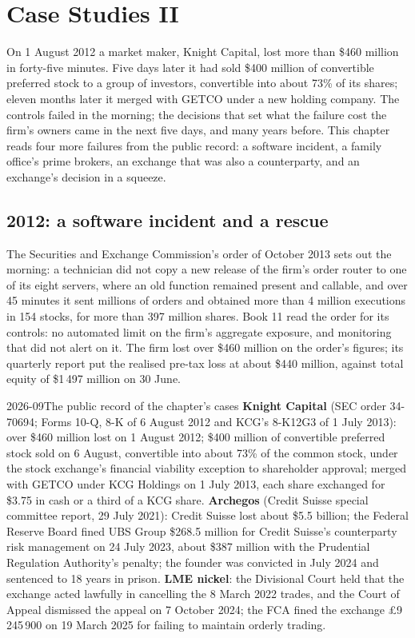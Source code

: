 \chapter{Case Studies II}\label{ch:fm:case-studies-ii}

On 1 August 2012 a market maker, Knight Capital, lost more than \$460 million in forty-five minutes. Five days later it had sold \$400 million of
convertible preferred stock to a group of investors, convertible into about 73\% of its shares; eleven months later it merged with GETCO under a new
holding company. The controls failed in the morning; the decisions that set what the failure cost the firm's owners came in the next five days, and
many years before. This chapter reads four more failures from the public record: a software incident, a family office's prime brokers, an
exchange that was also a counterparty, and an exchange's decision in a squeeze.

\section{2012: a software incident and a rescue}

The Securities and Exchange Commission's order of October 2013 sets out the morning: a technician did not copy a new release of the firm's order router to
one of its eight servers, where an old function remained present and callable, and over 45 minutes it sent millions of orders and obtained more than 4 million executions in 154 stocks,
for more than 397 million shares. Book 11 read the order for its controls: no automated limit on the firm's aggregate exposure, and monitoring that
did not alert on it. The firm lost over \$460 million on the order's figures; its quarterly report put the realised pre-tax loss at about \$440 million,
against total equity of \$1\,497 million on 30 June.

\begin{dated}{2026-09}{The public record of the chapter's cases}\label{dat:fm:case-studies-ii:record}
\textbf{Knight Capital} (SEC order 34-70694; Forms 10-Q, 8-K of 6 August 2012 and KCG's 8-K12G3 of 1 July 2013): over \$460 million lost on 1
August 2012; \$400 million of convertible preferred stock sold on 6 August, convertible into about 73\% of the common stock, under the stock exchange's
financial viability exception to shareholder approval; merged with GETCO under KCG Holdings on 1 July 2013, each share exchanged for \$3.75 in cash
or a third of a KCG share. \textbf{Archegos} (Credit Suisse special committee report, 29 July 2021): Credit Suisse lost about \$5.5 billion; the Federal
Reserve Board fined UBS Group \$268.5 million for Credit Suisse's counterparty risk management on 24 July 2023, about \$387 million with the Prudential
Regulation Authority's penalty; the founder was convicted in July 2024 and sentenced to 18 years in prison. \textbf{LME nickel}: the Divisional Court
held that the exchange acted lawfully in cancelling the 8 March 2022 trades, and the Court of Appeal dismissed the appeal on 7 October 2024; the FCA
fined the exchange \pounds9\,245\,900 on 19 March 2025 for failing to maintain orderly trading.
\end{dated}

